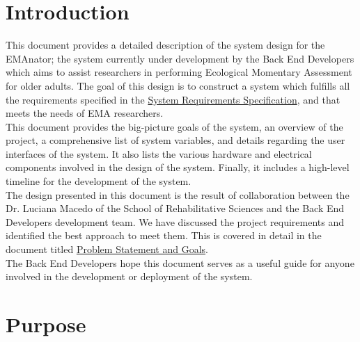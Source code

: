 \documentclass[12pt, titlepage]{article}
\begin{document}
\newpage

\tableofcontents

\newpage

\listoftables

\listoffigures

\newpage


\section{Introduction}

This document provides a detailed description of the system design for the EMAnator; the system currently under development by the Back End Developers which aims to assist researchers in performing Ecological Momentary Assessment for older adults. The goal of this design is to construct a system which fulfills all the requirements specified in the \href{https://github.com/zakerl/Capstone_Project/blob/desDoc_Labeeb/docs/SRS/SRS.pdf}{System Requirements Specification}, and that meets the needs of EMA researchers.\\

This document provides the big-picture goals of the system, an overview of the project, a comprehensive list of system variables, and details regarding the user interfaces of the system. It also lists the various hardware and electrical components involved in the design of the system. Finally, it includes a high-level timeline for the development of the system. \\

The design presented in this document is the result of collaboration between the Dr. Luciana Macedo of the School of Rehabilitative Sciences and the Back End Developers development team. We have discussed the project requirements and identified the best approach to meet them. This is covered in detail in the document titled \href{https://github.com/zakerl/Capstone_Project/blob/desDoc_Labeeb/docs/ProblemStatementAndGoals/Team1_ProblemStatement\%20\%26\%20Goals.pdf}{Problem Statement and Goals}.\\

The Back End Developers hope this document serves as a useful guide for anyone involved in the development or deployment of the system. \\


\section{Purpose}
\end{document}
